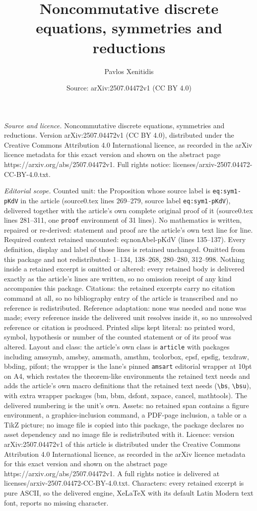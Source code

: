 \documentclass[10pt,a4paper]{amsart}
\title[Noncommutative discrete equations, symmetries and reductions]{Noncommutative discrete equations, symmetries and reductions}
\author{Pavlos Xenitidis}
\date{Source: arXiv:2507.04472v1 (CC BY 4.0)}
\begin{document}
\maketitle

\noindent\emph{Source and licence.} Noncommutative discrete equations, symmetries and reductions. Version arXiv:2507.04472v1 (CC BY 4.0), distributed under the Creative Commons Attribution 4.0 International licence, as recorded in the arXiv licence metadata for this exact version and shown on the abstract page https://arxiv.org/abs/2507.04472v1. Full rights notice: licenses/arxiv-2507.04472-CC-BY-4.0.txt.\par\smallskip

\noindent\textit{Editorial scope.} Counted unit: the Proposition whose source label is \texttt{eq:sym1-pKdV} in the article (source0.tex lines 269--279, source label \texttt{eq:sym1-pKdV}), delivered together with the article's own complete original proof of it (source0.tex lines 281--311, one \texttt{proof} environment of 31 lines). No mathematics is written, repaired or re-derived: statement and proof are the article's own text line for line. Required context retained uncounted: eq:nonAbel-pKdV (lines 135--137). Every definition, display and label of those lines is retained unchanged. Omitted from this package and not redistributed: 1--134, 138--268, 280--280, 312--998. Nothing inside a retained excerpt is omitted or altered: every retained body is delivered exactly as the article's lines are written, so no omission receipt of any kind accompanies this package. Citations: the retained excerpts carry no citation command at all, so no bibliography entry of the article is transcribed and no reference is redistributed. Reference adaptation: none was needed and none was made; every reference inside the delivered unit resolves inside it, so no unresolved reference or citation is produced. Printed slips kept literal: no printed word, symbol, hypothesis or number of the counted statement or of its proof was altered. Layout and class: the article's own class is \texttt{article} with packages including amssymb, amsbsy, amsmath, amsthm, tcolorbox, epsf, epsfig, texdraw, bbding, pifont; the wrapper is the lane's pinned \texttt{amsart} editorial wrapper at 10pt on A4, which restates the theorem-like environments the retained text needs and adds the article's own macro definitions that the retained text needs (\texttt{\textbackslash bs}, \texttt{\textbackslash bsu}), with extra wrapper packages (bm, bbm, dsfont, xspace, cancel, mathtools). The delivered numbering is the unit's own. Assets: no retained span contains a figure environment, a graphics-inclusion command, a PDF-page inclusion, a table or a TikZ picture; no image file is copied into this package, the package declares no asset dependency and no image file is redistributed with it. Licence: version arXiv:2507.04472v1 of this article is distributed under the Creative Commons Attribution 4.0 International licence, as recorded in the arXiv licence metadata for this exact version and shown on the abstract page https://arxiv.org/abs/2507.04472v1. A full rights notice is delivered at licenses/arxiv-2507.04472-CC-BY-4.0.txt. Characters: every retained excerpt is pure ASCII, so the delivered engine, XeLaTeX with its default Latin Modern text font, reports no missing character.
\end{document}
